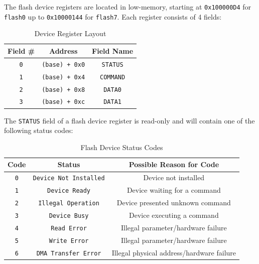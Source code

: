 \documentclass[12pt,a4paper,openright,twoside]{report}
\begin{document}
The flash device registers are located in low-memory, starting at \texttt{0x100000D4} for \texttt{flash0} up to \texttt{0x10000144} for \texttt{flash7}.
Each register consists of 4 fields:
\begin{table}[h]
	\centering
	\begin{tabular}{c|c|c}
		Field \#   & Address               & Field Name       \\  \hline\hline
		\texttt{0} & \texttt{(base) + 0x0} & \texttt{STATUS}  \\ \hline
		\texttt{1} & \texttt{(base) + 0x4} & \texttt{COMMAND} \\ \hline
		\texttt{2} & \texttt{(base) + 0x8} & \texttt{DATA0}   \\ \hline
		\texttt{3} & \texttt{(base) + 0xc} & \texttt{DATA1}
	\end{tabular}
	\caption{Device Register Layout}
	\label{tab:device_register_layout}
\end{table}

The \texttt{STATUS} field of a flash device register is read-only and will contain one of the following status codes:
\begin{table}[h]
	\centering
	\begin{tabular}{c|c|c}
		Code       & Status                        & Possible Reason for Code                  \\  \hline\hline
		\texttt{0} & \texttt{Device Not Installed} & Device not installed                      \\ \hline
		\texttt{1} & \texttt{Device Ready}         & Device waiting for a command              \\ \hline
		\texttt{2} & \texttt{Illegal Operation}    & Device presented unknown command          \\ \hline
		\texttt{3} & \texttt{Device Busy}          & Device executing a command                \\ \hline
		\texttt{4} & \texttt{Read Error}           & Illegal parameter/hardware failure        \\ \hline
		\texttt{5} & \texttt{Write Error}          & Illegal parameter/hardware failure        \\ \hline
		\texttt{6} & \texttt{DMA Transfer Error}   & Illegal physical address/hardware failure
	\end{tabular}
	\caption{Flash Device Status Codes}
\end{table}
\end{document}
